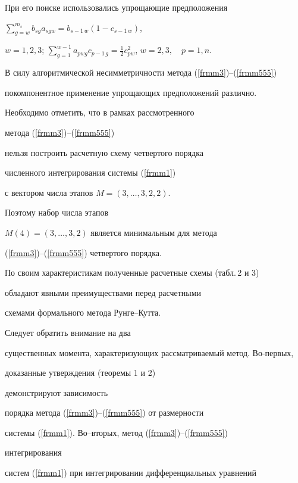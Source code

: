 \noindent{}При его поиске использовались упрощающие предположения


$\sum\limits_{g=w}^{m_s}b_{sg} a_{sgw}


=b_{s-1\,w}(1-c_{s-1\,w})$,


$w=1,2,3$; $\sum\limits_{g=1}^{w-1}a_{pwg} c_{p-1\,g}


=\frac12 c_{pw} ^2$, $w=2,3,\quad p=1,n$.





В силу алгоритмической несимметричности метода (\ref{frmm3})--(\ref{frmm555})


покомпонентное применение упрощающих предположений различно.





Необходимо отметить, что в рамках рассмотренного


метода (\ref{frmm3})--(\ref{frmm555})


нельзя построить расчетную схему четвертого порядка 


численного интегрирования системы (\ref{frmm1})


с вектором числа этапов $M=(3,\dotsc,3,2,2)$.


Поэтому набор числа этапов


$M(4)=(3,\dotsc,3,2)$ является минимальным для метода


(\ref{frmm3})--(\ref{frmm555}) четвертого порядка.





По своим характеристикам полученные расчетные схемы (табл.\,2 и 3)


обладают явными преимуществами перед расчетными


схемами формального метода Рунге--Кутта. 


Следует обратить внимание на два


существенных момента, характеризующих рассматриваемый метод. Во-первых, 


доказанные утверждения (теоремы 1 и 2)


демонстрируют зависимость


порядка метода (\ref{frmm3})--(\ref{frmm555}) от размерности


системы (\ref{frmm1}). Во--вторых, метод (\ref{frmm3})--(\ref{frmm555})


интегрирования


систем (\ref{frmm1}) при интегрировании дифференциальных уравнений



